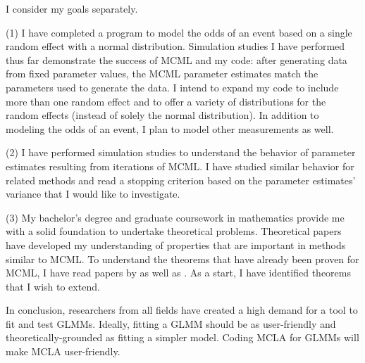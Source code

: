 \documentclass[12pt]{article}
\begin{document}

I consider my  goals separately. 


(1) I have completed a program to model the odds  of an event based on a single random effect with a normal distribution. Simulation studies I have performed thus far demonstrate the success of MCML and my code: after generating data from fixed parameter values, the MCML parameter estimates  match the  parameters used to generate the data. I intend to expand my code  to include more than one random effect and to offer a variety of distributions for the random effects (instead of solely the normal distribution). In addition to modeling the odds of an event, I plan to model other measurements as well. 

(2) I have performed simulation studies to understand the behavior of parameter estimates resulting from iterations of MCML. I have studied similar behavior for related methods and read  a stopping criterion based on the parameter estimates' variance that I would like to investigate.  

(3) My bachelor's degree and graduate coursework in mathematics provide me with a solid foundation to undertake  theoretical problems. Theoretical papers have developed my understanding of properties that are important in methods similar to MCML.  To understand the  theorems that have already been proven for MCML, I have read papers by \citet{geyer:1994} as well as \citet{sung:geyer:2007}. As a start, I have identified theorems that I wish to extend. 


In conclusion, researchers from all fields have created a high demand for a tool to fit and test GLMMs. Ideally, fitting a GLMM should be as user-friendly and theoretically-grounded as fitting a simpler model. Coding MCLA for GLMMs will make MCLA user-friendly. 

\vspace{-2.3cm}
\renewcommand{\refname}{}


\end{document}
